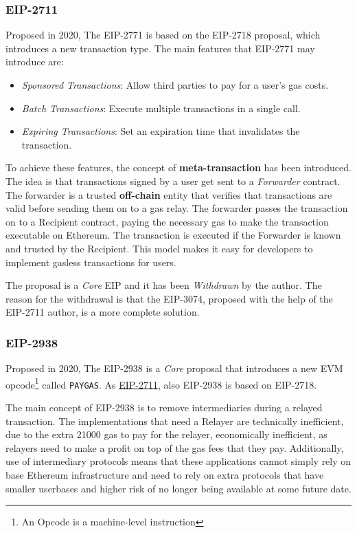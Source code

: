 \subsubsection{EIP-2711} %
\label{subsubsec:eip-2711}

Proposed in 2020, The EIP-2771 is based on the EIP-2718 proposal, which introduces a new transaction type. The main features that EIP-2771 may introduce are: \cite{eip-2711} 

\begin{itemize}
    \item \textit{Sponsored Transactions}: Allow third parties to pay for a user's gas costs.
    \item \textit{Batch Transactions}: Execute multiple transactions in a single call.
    \item \textit{Expiring Transactions}: Set an expiration time that invalidates the transaction.
\end{itemize}

To achieve these features, the concept of \textbf{meta-transaction} has been introduced. The idea is that transactions signed by a user get sent to a \textit{Forwarder} contract. The forwarder is a trusted \textbf{off-chain} entity that verifies that transactions are valid before sending them on to a gas relay. The forwarder passes the transaction on to a Recipient contract, paying the necessary gas to make the transaction executable on Ethereum. The transaction is executed if the Forwarder is known and trusted by the Recipient. This model makes it easy for developers to implement gasless transactions for users. \cite{ethereum-account-abstraction}

The proposal is a \textit{Core} EIP and it has been \textit{Withdrawn} by the author. The reason for the withdrawal is that the EIP-3074, proposed with the help of the EIP-2711 author, is a more complete solution. \cite{eip-2711}

\subsubsection{EIP-2938}
\label{subsubsec:eip-2938}

Proposed in 2020, The EIP-2938 is a \textit{Core} proposal that introduces a new EVM opcode\footnote{An Opcode is a machine-level instruction} called \texttt{PAYGAS}. As \hyperref[subsubsec:eip-2711]{EIP-2711}, also EIP-2938 is based on EIP-2718.

The main concept of EIP-2938 is to remove intermediaries during a relayed transaction. The implementations that need a Relayer are technically inefficient, due to the extra 21000 gas to pay for the relayer, economically inefficient, as relayers need to make a profit on top of the gas fees that they pay. Additionally, use of intermediary protocols means that these applications cannot simply rely on base Ethereum infrastructure and need to rely on extra protocols that have smaller userbases and higher risk of no longer being available at some future date. \cite{eip-2938}

